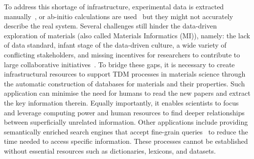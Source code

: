 \documentclass[]{interact}
\theoremstyle{plain}%
\theoremstyle{definition}
\theoremstyle{remark}
\begin{document}
To address this shortage of infrastructure, experimental data is extracted manually~\cite{doi:10.1021/cm400893e}, or ab-initio calculations are used~\cite{Jain2013CommentaryTM_materialsProject} but they might not accurately describe the real system.
Several challenges still hinder the data-driven exploration of materials (also called Materials Informatics (MI)), namely: the lack of data standard, infant stage of the data-driven culture, a wide variety of conflicting stakeholders, and missing incentives for researchers to contribute to large collaborative initiatives~\cite{Hill2016MaterialsSW}. 
To bridge these gaps, it is necessary to create infrastructural resources to support TDM processes in materials science through the automatic construction of databases for materials and their properties. 
Such application can minimise the need for humans to read the new papers and extract the key information therein. 
Equally importantly, it enables scientists to focus and leverage computing power and human resources to find deeper relationships between superficially unrelated information. 
Other applications include providing semantically enriched search engines that accept fine-grain queries~\cite{Liu2019SurfaceMR} to reduce the time needed to access specific information. 
These processes cannot be established without essential resources such as dictionaries, lexicons, and datasets. 
\end{document}
